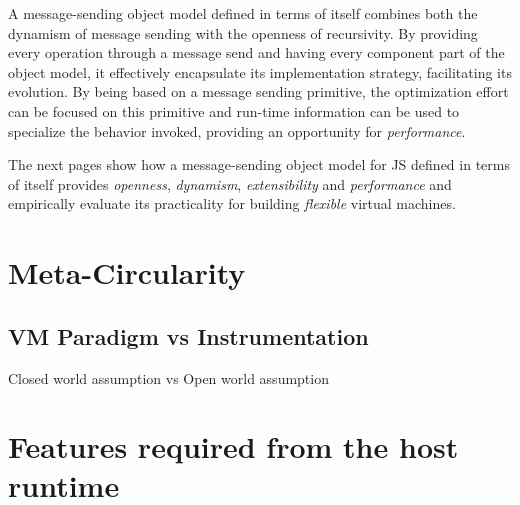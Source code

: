 A message-sending object model defined in terms of itself combines both the
dynamism of message sending with the openness of recursivity. By providing
every operation through a message send and having every component part of the
object model, it effectively encapsulate its implementation strategy,
facilitating its evolution. By being based on a message sending primitive, the
optimization effort can be focused on this primitive and run-time information
can be used to specialize the behavior invoked, providing an opportunity for
\textit{performance}. 

The next pages show how a message-sending object model for JS defined in terms of
itself provides \textit{openness}, \textit{dynamism}, \textit{extensibility}
and \textit{performance} and empirically evaluate its practicality for building
\textit{flexible} virtual machines.

\section{Meta-Circularity}
\subsection{VM Paradigm vs Instrumentation}
Closed world assumption vs Open world assumption

\section{Features required from the host runtime}


